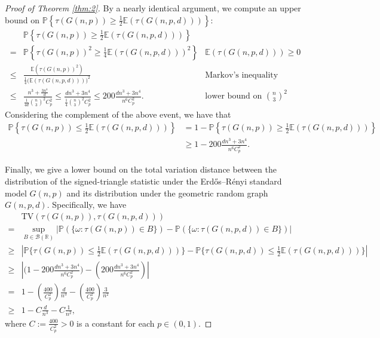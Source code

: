 \documentclass{article}
\begin{document}
\begin{proof}[Proof of Theorem \ref{thm:2}]
By a nearly identical argument, we compute an upper  bound on $\mathbb{P}\left\{ \tau(G(n,p)) \geq \frac{1}{2}\mathbb{E}(\tau(G(n,p,d))) \right\}$:
\begin{align*}
    &\mathbb{P}\left\{ \tau(G(n,p)) \geq \frac{1}{2}\mathbb{E}(\tau(G(n,p,d))) \right\}\\
    =&\mathbb{P}\left\{ \tau(G(n,p))^2 \geq \frac{1}{4}\mathbb{E}(\tau(G(n,p,d)))^2 \right\} & \mathbb{E}(\tau(G(n,p,d))) \geq 0\\
    \leq& \frac{\mathbb{E}(\tau(G(n,p))^2)}{\frac{1}{4}\bigg(\mathbb{E}(\tau(G(n,p,d))) \bigg)^2} & \text{Markov's inequality}\\
    \leq& \frac{n^3 + \frac{3n^4}{d}}{\frac{1}{4d} \binom{n}{3}^2 C_p^2} \leq \frac{dn^3 + 3n^4}{\frac{1}{4} \binom{n}{3}^2 C_p^2} \leq 200\frac{dn^3 + 3n^4}{n^6 C_p^2}. & \text{lower bound on $\binom{n}{3}^2$}
\end{align*}
Considering the complement of the above event, we have that
\begin{align}
    \mathbb{P}\left\{ \tau(G(n,p)) \leq \frac{1}{2}\mathbb{E}(\tau(G(n,p,d))) \right\} &=  1 - \mathbb{P}\left\{ \tau(G(n,p)) \geq \frac{1}{2}\mathbb{E}(\tau(G(n,p,d))) \right\} \nonumber\\
    &\geq 1 - 200\frac{dn^3 + 3n^4}{n^6 C_p^2}\label{eq27}.
\end{align}

Finally, we give a lower bound on the total variation distance between the distribution of the signed-triangle statistic under the Erdős–Rényi standard model $G(n, p)$ and its distribution under the geometric random graph $G(n,p,d)$. Specifically, we have
\begin{align*}
    &\text{TV}(\tau(G(n,p)), \tau(G(n,p, d)))\\ 
    =&\underset{B \in \mathcal{B}(\mathbb{R})}{\sup} \left| \mathbb{P}(\{\omega: \tau(G(n,p)) \in B \}) - \mathbb{P}(\{\omega: \tau(G(n,p, d)) \in B \}) \right|\\
    \geq& \left| \mathbb{P}\bigg\{ \tau(G(n,p)) \leq \frac{1}{2}\mathbb{E}(\tau(G(n,p,d))) \bigg\} - \mathbb{P}\bigg\{ \tau(G(n,p,d)) \leq \frac{1}{2}\mathbb{E}(\tau(G(n,p,d))) \bigg\} \right|\\
    \geq& \left| \bigg( 1 - 200\frac{dn^3 + 3n^4}{n^6 C_p^2} \bigg) - \left(200\frac{dn^3 + 3n^4}{n^6 C_p^2} \right) \right|\\
    =& 1 - \left(\frac{400}{C_p^2} \right)\frac{d}{n^3} - \left(\frac{400}{C_p^2} \right)\frac{3}{n^2}\\
    \geq& 1 - C\frac{d}{n^3} - C\frac{1}{n^2},
\end{align*}
where $C := \frac{400}{C_p^2} > 0$ is a constant for each $p \in (0,1)$.


\end{proof}
\end{document}
